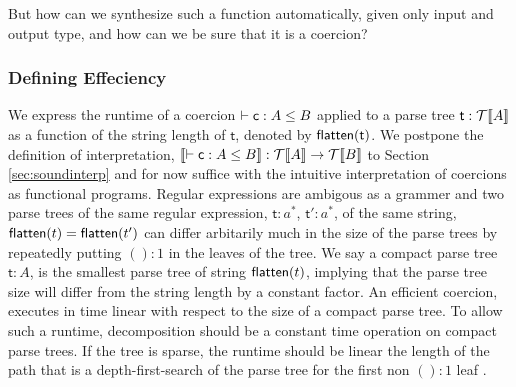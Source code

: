 But how can we synthesize such a function automatically, given only input and output type, and how can we be sure that it is a coercion? 





\subsubsection{Defining Effeciency}
We express the runtime of a coercion $\vdash \mathsf{c} : A \leq B$ applied to a parse tree $\mathsf{t} : \mathcal{T}\llbracket A \rrbracket$ as a function of the string length of $\mathsf{t}$, denoted by $\mathsf{flatten}(\mathsf{t})$. We postpone the definition of interpretation, $\llbracket \vdash \mathsf{c} : A \leq B \rrbracket : \mathcal{T}\llbracket A \rrbracket \rightarrow \mathcal{T}\llbracket B \rrbracket$ to Section \ref{sec:soundinterp} and for now suffice with the intuitive interpretation of coercions as functional programs.
Regular expressions are ambigous as a grammer and two parse trees of the same regular expression, $\mathsf{t} : a^*$, $\mathsf{t'} : a^*$, of the same string, $\mathsf{flatten}(t)=\mathsf{flatten}(t')$ can differ arbitarily much in the size of the parse trees by repeatedly putting  $() : 1$ in the leaves of the tree. We say a compact parse tree $\mathsf{t} : A$, is the smallest parse tree of string $\mathsf{flatten}(t)$, implying that the parse tree size will differ from the string length by a constant factor. An efficient coercion, executes in time linear with respect to the size of a compact parse tree.
To allow such a runtime, decomposition should be a constant time operation on compact parse trees. If the tree is sparse, the runtime should be linear the length of the path that is a depth-first-search of the parse tree for the first non $(): 1$ leaf .


